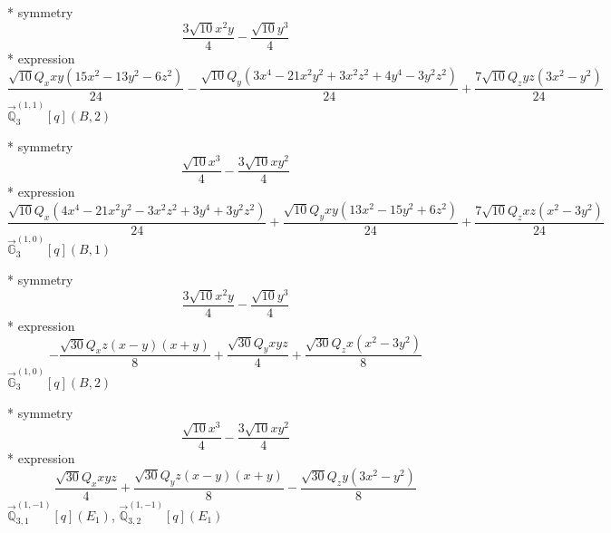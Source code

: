 \documentclass[fleqn,8pt]{jsarticle}
\begin{document}
\noindent\quad ** symmetry
\begin{dmath*}
\frac{3 \sqrt{10} x^{2} y}{4} - \frac{\sqrt{10} y^{3}}{4}
\end{dmath*}
\noindent\quad ** expression
\begin{dmath*}
\frac{\sqrt{10} Q_{x} x y \left(15 x^{2} - 13 y^{2} - 6 z^{2}\right)}{24} - \frac{\sqrt{10} Q_{y} \left(3 x^{4} - 21 x^{2} y^{2} + 3 x^{2} z^{2} + 4 y^{4} - 3 y^{2} z^{2}\right)}{24} + \frac{7 \sqrt{10} Q_{z} y z \left(3 x^{2} - y^{2}\right)}{24}
\end{dmath*}
\noindent\quad $\vec{\mathbb{Q}}_{3}^{(1,1)}[q](B,2)$

\noindent\quad ** symmetry
\begin{dmath*}
\frac{\sqrt{10} x^{3}}{4} - \frac{3 \sqrt{10} x y^{2}}{4}
\end{dmath*}
\noindent\quad ** expression
\begin{dmath*}
\frac{\sqrt{10} Q_{x} \left(4 x^{4} - 21 x^{2} y^{2} - 3 x^{2} z^{2} + 3 y^{4} + 3 y^{2} z^{2}\right)}{24} + \frac{\sqrt{10} Q_{y} x y \left(13 x^{2} - 15 y^{2} + 6 z^{2}\right)}{24} + \frac{7 \sqrt{10} Q_{z} x z \left(x^{2} - 3 y^{2}\right)}{24}
\end{dmath*}
\noindent\quad $\vec{\mathbb{G}}_{3}^{(1,0)}[q](B,1)$

\noindent\quad ** symmetry
\begin{dmath*}
\frac{3 \sqrt{10} x^{2} y}{4} - \frac{\sqrt{10} y^{3}}{4}
\end{dmath*}
\noindent\quad ** expression
\begin{dmath*}
- \frac{\sqrt{30} Q_{x} z \left(x - y\right) \left(x + y\right)}{8} + \frac{\sqrt{30} Q_{y} x y z}{4} + \frac{\sqrt{30} Q_{z} x \left(x^{2} - 3 y^{2}\right)}{8}
\end{dmath*}
\noindent\quad $\vec{\mathbb{G}}_{3}^{(1,0)}[q](B,2)$

\noindent\quad ** symmetry
\begin{dmath*}
\frac{\sqrt{10} x^{3}}{4} - \frac{3 \sqrt{10} x y^{2}}{4}
\end{dmath*}
\noindent\quad ** expression
\begin{dmath*}
\frac{\sqrt{30} Q_{x} x y z}{4} + \frac{\sqrt{30} Q_{y} z \left(x - y\right) \left(x + y\right)}{8} - \frac{\sqrt{30} Q_{z} y \left(3 x^{2} - y^{2}\right)}{8}
\end{dmath*}
\noindent\quad $\vec{\mathbb{Q}}_{3,1}^{(1,-1)}[q](E_{1})$, $\vec{\mathbb{Q}}_{3,2}^{(1,-1)}[q](E_{1})$
\end{document}
